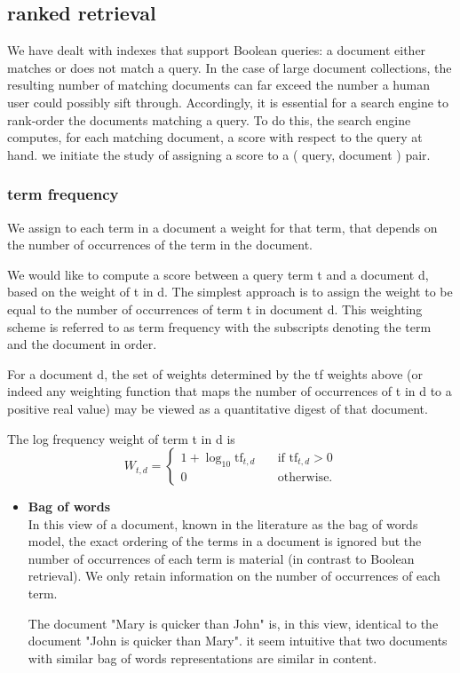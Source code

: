 \subsection{ranked retrieval}

We have dealt with indexes that support Boolean queries: a document
either matches or does not match a query. In the case of large document
collections, the resulting number of matching documents can far exceed the
number a human user could possibly sift through. Accordingly, it is essential
for a search engine to rank-order the documents matching a query. 
To do this, the search engine computes, for each matching document, a score with
respect to the query at hand. 
we initiate the study of assigning a score to a ( query, document ) pair.

\subsubsection{term frequency}

We assign to each term in a document a weight for that term, that depends on the number of occurrences of the term in the document.

We would like to compute a score between a query term t and a document d, based on the weight of t in d. The simplest approach is to assign the weight to be equal to the number of occurrences of term t in document d.
This weighting scheme is referred to as term frequency with the subscripts denoting the term and the document in order.

For a document d, the set of weights determined by the tf weights above
(or indeed any weighting function that maps the number of occurrences of t
in d to a positive real value) may be viewed as a quantitative digest of that
document.


The log frequency weight of term t in d is\\
\begin{equation}
    W_{t,d} =\begin{cases} 
   1+\log_{10}\text{tf}_{t,d} &\quad \text{if  }\text{tf}_{t,d} > 0  \\ 0  &\quad  \text{otherwise.} \end{cases}
\end{equation}
  
       

\begin{itemize}
     \item \textbf{Bag of words}\\
     In this view of a document, known in the literature as the bag
     of words model, the exact ordering of the terms in a document is ignored but
     the number of occurrences of each term is material (in contrast to Boolean
     retrieval). 
     We only retain information on the number of occurrences of each term. 
    
     The document "Mary is quicker than John" is, in this view, identical to the document "John is quicker than Mary". it seem intuitive that two documents with similar bag of words representations are
     similar in content.
\end{itemize} 

